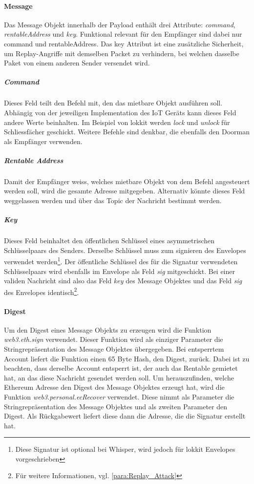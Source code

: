 \paragraph{Message}
\label{sys_para:Message}
Das Message Objekt innerhalb der Payload enthält drei Attribute: \emph{command}, \emph{rentableAddress} und \emph{key}. Funktional relevant für den Empfänger sind dabei nur command und rentableAddress. Das key Attribut ist eine zusätzliche Sicherheit, um Replay-Angriffe mit demselben Packet zu verhindern, bei welchen dasselbe Paket von einem anderen Sender versendet wird.
\subparagraph{Command}
\label{sys_subpara:Command}
Dieses Feld teilt den Befehl mit, den das mietbare Objekt ausführen soll. Abhängig von der jeweiligen Implementation des IoT Geräts kann dieses Feld andere Werte beinhalten. Im Beispiel von lokkit werden \emph{lock} und \emph{unlock} für Schliessfächer geschickt. Weitere Befehle sind denkbar, die ebenfalls den Doorman als Empfänger verwenden.
\subparagraph{Rentable Address}
Damit der Empfänger weiss, welches mietbare Objekt von dem Befehl angesteuert werden soll, wird die gesamte Adresse mitgegeben. Alternativ könnte dieses Feld weggelassen werden und über das Topic der Nachricht bestimmt werden.

\subparagraph{Key}
\label{sys_para:Key}
Dieses Feld beinhaltet den öffentlichen Schlüssel eines asymmetrischen Schlüsselpaars des Senders. Derselbe Schlüssel muss zum signieren des Envelopes verwendet werden\footnote{Diese Signatur ist optional bei Whisper, wird jedoch für lokkit Envelopes vorgeschrieben}. Der öffentliche Schlüssel des für die Signatur verwendeten Schlüsselpaars wird ebenfalls im Envelope als Feld \emph{sig} mitgeschickt. Bei einer validen Nachricht sind also das Feld \emph{key} des Message Objektes und das Feld \emph{sig} des Envelopes identisch\footnote{Für weitere Informationen, vgl. \ref{para:Replay_Attack}}.

\paragraph{Digest}
\label{sys_para:Digest}
Um den Digest eines Message Objekts zu erzeugen wird die Funktion \emph{web3.eth.sign} verwendet. Dieser Funktion wird als einziger Parameter die Stringrepräsentation des Message Objektes übergegeben. Bei entsperrtem Account liefert die Funktion einen 65 Byte Hash, den Digest, zurück. Dabei ist zu beachten, dass derselbe Account entsperrt ist, der auch das Rentable gemietet hat, an das diese Nachricht gesendet werden soll. Um herauszufinden, welche Ethereum Adresse den Digest des Message Objektes erzeugt hat, wird die Funktion \emph{web3.personal.ecRecover} verwendet. Diese nimmt als Parameter die Stringrepräsentation des Message Objektes und als zweiten Parameter den Digest. Als Rückgabewert liefert diese dann die Adresse, die die Signatur erstellt hat.

